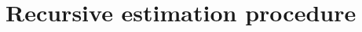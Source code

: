 \documentclass[]{elsarticle}
\makeatletter
\theoremstyle{definition}
\newcommand{\bvec}[1]{\boldsymbol{#1}}
\newcommand{\vx}{\bvec{x}}
\newcommand*{\ov}[1]{
  \m@th\overline{\mbox{#1}\raisebox{2mm}{}}
}
\makeatother
\begin{document}
\section{Recursive estimation procedure}
\label{section.recursive.procedure}
%
%
%
\end{document}
